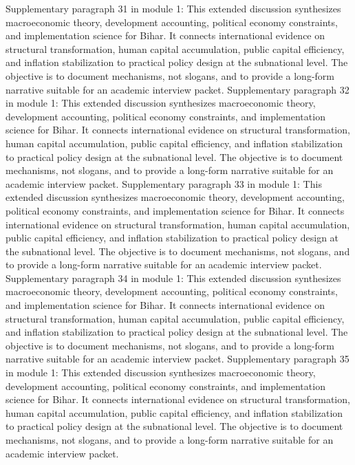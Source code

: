 \documentclass[preprint,12pt]{elsarticle}
\begin{document}
Supplementary paragraph 31 in module 1: This extended discussion synthesizes macroeconomic theory, development accounting, political economy constraints, and implementation science for Bihar. It connects international evidence on structural transformation, human capital accumulation, public capital efficiency, and inflation stabilization to practical policy design at the subnational level. The objective is to document mechanisms, not slogans, and to provide a long-form narrative suitable for an academic interview packet.
Supplementary paragraph 32 in module 1: This extended discussion synthesizes macroeconomic theory, development accounting, political economy constraints, and implementation science for Bihar. It connects international evidence on structural transformation, human capital accumulation, public capital efficiency, and inflation stabilization to practical policy design at the subnational level. The objective is to document mechanisms, not slogans, and to provide a long-form narrative suitable for an academic interview packet.
Supplementary paragraph 33 in module 1: This extended discussion synthesizes macroeconomic theory, development accounting, political economy constraints, and implementation science for Bihar. It connects international evidence on structural transformation, human capital accumulation, public capital efficiency, and inflation stabilization to practical policy design at the subnational level. The objective is to document mechanisms, not slogans, and to provide a long-form narrative suitable for an academic interview packet.
Supplementary paragraph 34 in module 1: This extended discussion synthesizes macroeconomic theory, development accounting, political economy constraints, and implementation science for Bihar. It connects international evidence on structural transformation, human capital accumulation, public capital efficiency, and inflation stabilization to practical policy design at the subnational level. The objective is to document mechanisms, not slogans, and to provide a long-form narrative suitable for an academic interview packet.
Supplementary paragraph 35 in module 1: This extended discussion synthesizes macroeconomic theory, development accounting, political economy constraints, and implementation science for Bihar. It connects international evidence on structural transformation, human capital accumulation, public capital efficiency, and inflation stabilization to practical policy design at the subnational level. The objective is to document mechanisms, not slogans, and to provide a long-form narrative suitable for an academic interview packet.
\end{document}
